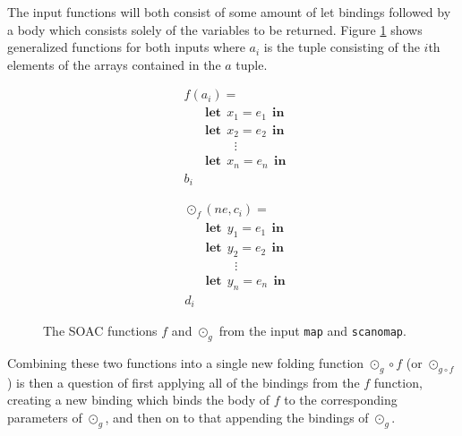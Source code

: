 \documentclass[11pt]{article}
\newcommand\lett{\phantom{-}\:\:\mathbf{let}\:\:}
\newcommand\inn{\:\:\mathbf{in}\:\:}
\begin{document}
The input functions will both consist of some amount of let bindings followed by a body which consists solely of the variables to be returned. Figure \ref{fig:bothfuns} shows generalized functions for both
 inputs where $a_i$ is the tuple consisting of the $i$th elements of the arrays contained in the $a$ tuple. 
 \begin{figure}[hb!]

   \begin{mdframed}
 \begin{minipage}{0.5\linewidth}
     \centering

       \begin{align*}
         &f(a_i) = \\
         &\lett x_1 = e_1 \inn\\
         &\lett x_2 = e_2 \inn\\
         &\phantom{----}\vdots\\
         &\lett x_n = e_n \inn\\
         &b_i
       \end{align*}

     \label{fig:mapf}
 \end{minipage}
 \begin{minipage}{0.5\linewidth}
     \centering

     \begin{align*}
       &\odot_f(ne, c_i) = \\
       &\lett y_1 = e_1 \inn\\
       &\lett y_2 = e_2 \inn\\
       &\phantom{----}\vdots\\
       &\lett y_n = e_n \inn\\
       &d_i
     \end{align*}

     \label{fig:odotg}
   \end{minipage}

     \end{mdframed}
     \caption{The SOAC functions $f$ and $\odot_g$ from the input
       \texttt{map} and \texttt{scanomap}.}
     \label{fig:bothfuns}
\end{figure}

Combining these two functions into a single new folding function $\odot_g \circ f$ (or $\odot_{g \circ f}$) is then a question of first applying all of the bindings
 from the $f$ function, creating a new binding which binds the body of $f$ to the corresponding parameters of $\odot_g$, and then on
 to that appending the bindings of $\odot_g$.
\end{document}
